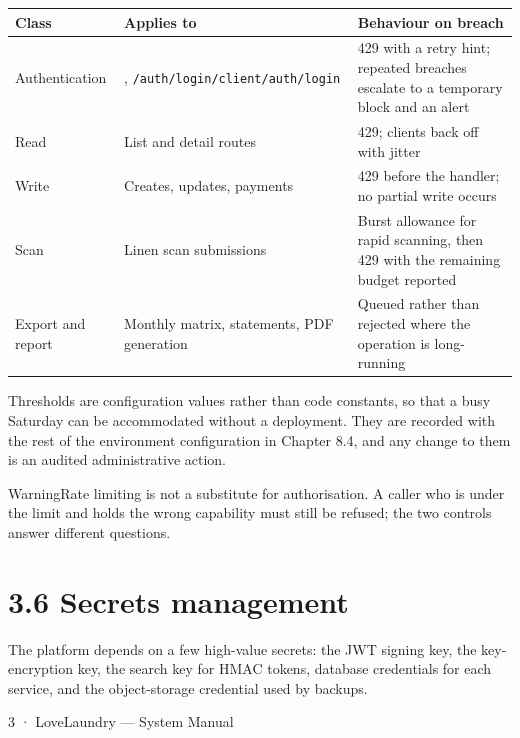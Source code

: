 \documentclass[11pt,a4paper,oneside]{book}
\begin{document}
\begin{center}\small
\begin{tabularx}{\linewidth}{|X|X|X|}
\hline
\rowcolor{lightgrey}
\textbf{Class} & \textbf{Applies to} & \textbf{Behaviour on breach} \\ \hline
Authentication & , \texttt{/auth/login}\texttt{/client/auth/login} & 429 with a retry hint; repeated breaches escalate to a temporary block and an alert \\ \hline
Read & List and detail routes & 429; clients back off with jitter \\ \hline
Write & Creates, updates, payments & 429 before the handler; no partial write occurs \\ \hline
Scan & Linen scan submissions & Burst allowance for rapid scanning, then 429 with the remaining budget reported \\ \hline
Export and report & Monthly matrix, statements, PDF generation & Queued rather than rejected where the operation is long-running \\ \hline
\end{tabularx}
\end{center}
Thresholds are configuration values rather than code constants, so that a busy Saturday can be accommodated without a deployment. They are recorded with the rest of the environment configuration in Chapter 8.4, and any change to them is an audited administrative action.

\begin{notebox}WarningRate limiting is not a substitute for authorisation. A caller who is under the limit and holds the wrong capability must still be refused; the two controls answer different questions.\end{notebox}
\section{3.6 Secrets management}
The platform depends on a few high-value secrets: the JWT signing key, the key-encryption key, the search key for HMAC tokens, database credentials for each service, and the object-storage credential used by backups.

3 · LoveLaundry — System Manual
\end{document}
